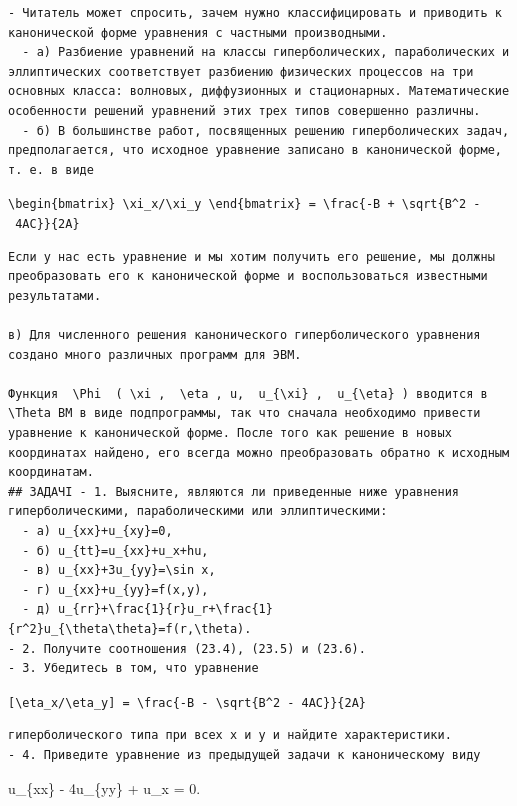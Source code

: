 \documentclass[
  ukrainian,
]{article}
\begin{document}
\begin{verbatim}
- Читатель может спросить, зачем нужно классифицировать и приводить к канонической форме уравнения с частными производными.
  - а) Разбиение уравнений на классы гиперболических, параболических и эллиптических соответствует разбиению физических процессов на три основных класса: волновых, диффузионных и стационарных. Математические особенности решений уравнений этих трех типов совершенно различны.
  - б) В большинстве работ, посвященных решению гиперболических задач, предполагается, что исходное уравнение записано в канонической форме, т. е. в виде
\end{verbatim}

\texttt{\textbackslash{}begin\{bmatrix\}\ \textbackslash{}xi\_x/\textbackslash{}xi\_y\ \textbackslash{}end\{bmatrix\}\ =\ \textbackslash{}frac\{-B\ +\ \textbackslash{}sqrt\{B\^{}2\ -\ 4AC\}\}\{2A\}}

\begin{verbatim}
Если у нас есть уравнение и мы хотим получить его решение, мы должны преобразовать его к канонической форме и воспользоваться известными результатами.

в) Для численного решения канонического гиперболического уравнения создано много различных программ для ЭВМ.

Функция  \Phi  ( \xi ,  \eta , u,  u_{\xi} ,  u_{\eta} ) вводится в  \Theta ВМ в виде подпрограммы, так что сначала необходимо привести уравнение к канонической форме. После того как решение в новых координатах найдено, его всегда можно преобразовать обратно к исходным координатам.
## ЗАДАЧІ - 1. Выясните, являются ли приведенные ниже уравнения гиперболическими, параболическими или эллиптическими:
  - a) u_{xx}+u_{xy}=0,
  - б) u_{tt}=u_{xx}+u_x+hu,
  - в) u_{xx}+3u_{yy}=\sin x,
  - г) u_{xx}+u_{yy}=f(x,y),
  - д) u_{rr}+\frac{1}{r}u_r+\frac{1}{r^2}u_{\theta\theta}=f(r,\theta).
- 2. Получите соотношения (23.4), (23.5) и (23.6).
- 3. Убедитесь в том, что уравнение
\end{verbatim}

\texttt{{[}\textbackslash{}eta\_x/\textbackslash{}eta\_y{]}\ =\ \textbackslash{}frac\{-B\ -\ \textbackslash{}sqrt\{B\^{}2\ -\ 4AC\}\}\{2A\}}

\begin{verbatim}
гиперболического типа при всех x и y и найдите характеристики.
- 4. Приведите уравнение из предыдущей задачи к каноническому виду
\end{verbatim}

u\_\{xx\} - 4u\_\{yy\} + u\_x = 0.
\end{document}
